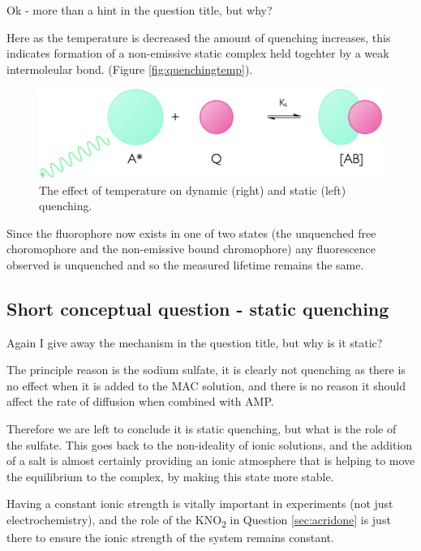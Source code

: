 \documentclass[
]{book}
\begin{document}
Ok - more than a hint in the question title, but why?

Here as the temperature is decreased the amount of quenching increases, this indicates formation of a non-emissive static complex held togehter by a weak intermoleular bond. (Figure \ref{fig:quenchingtemp}).

\begin{figure}

{\centering \includegraphics[width=1\linewidth]{images/staticquenching} 

}

\caption{The effect of temperature on dynamic (right) and static (left) quenching.}\label{fig:staticquench}
\end{figure}

Since the fluorophore now exists in one of two states (the unquenched free choromophore and the non-emissive bound chromophore) any fluorescence observed is unquenched and so the measured lifetime remains the same.

\hypertarget{sec:static2ans}{%
\subsection{Short conceptual question - static quenching}\label{sec:static2ans}}

Again I give away the mechanism in the question title, but why is it static?

The principle reason is the sodium sulfate, it is clearly not quenching as there is no effect when it is added to the MAC solution, and there is no reason it should affect the rate of diffusion when combined with AMP.

Therefore we are left to conclude it is static quenching, but what is the role of the sulfate. This goes back to the non-ideality of ionic solutions, and the addition of a salt is almost certainly providing an ionic atmosphere that is helping to move the equilibrium to the complex, by making this state more stable.

Having a constant ionic strength is vitally important in experiments (not just electrochemistry), and the role of the KNO\textsubscript{2} in Question \ref{sec:acridone} is just there to ensure the ionic strength of the system remains constant.
\end{document}
